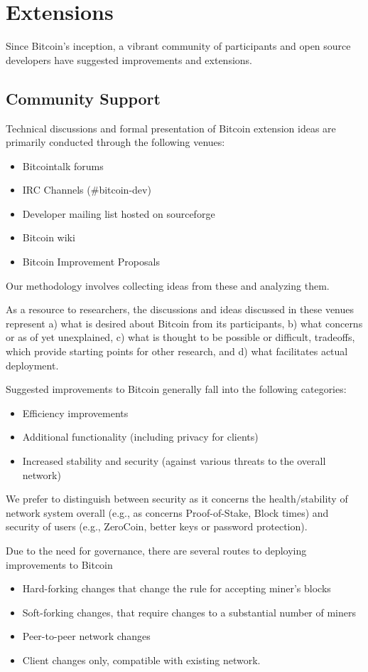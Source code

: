 \section{Extensions}

Since Bitcoin's inception, a vibrant community of participants and open source developers have suggested improvements and extensions.

\subsection{Community Support}
Technical discussions and formal presentation of Bitcoin extension ideas are primarily conducted through the following venues:
\begin{itemize}
\item Bitcointalk forums
\item IRC Channels (#bitcoin-dev)
\item Developer mailing list hosted on sourceforge
\item Bitcoin wiki
\item Bitcoin Improvement Proposals
\end{itemize}

Our methodology involves collecting ideas from these and analyzing them.

As a resource to researchers, the discussions and ideas discussed in these venues represent a) what is desired about Bitcoin from its participants, b) what concerns or as of yet unexplained, c) what is thought to be possible or difficult, tradeoffs, which provide starting points for other research, and d) what facilitates actual deployment.

Suggested improvements to Bitcoin generally fall into the following categories:
\begin{itemize}
\item Efficiency improvements
\item Additional functionality (including privacy for clients)
\item Increased stability and security (against various threats to the overall network)
\end{itemize}

We prefer to distinguish between security as it concerns the health/stability of network system overall (e.g., as concerns Proof-of-Stake, Block times) and security of users (e.g., ZeroCoin, better keys or password protection).

Due to the need for governance, there are several routes to deploying improvements to Bitcoin
\begin{itemize}
\item Hard-forking changes that change the rule for accepting miner's blocks
\item Soft-forking changes, that require changes to a substantial number of miners
\item Peer-to-peer network changes
\item Client changes only, compatible with existing network.
\end{itemize}

